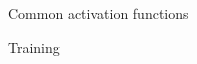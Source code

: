\begin{frame}{Common activation functions}
    
    \begin{figure}
       \centering
    \end{figure}

\end{frame}


\begin{frame}{Training}
    
    \begin{figure}
       \centering
    \end{figure}

\end{frame}


